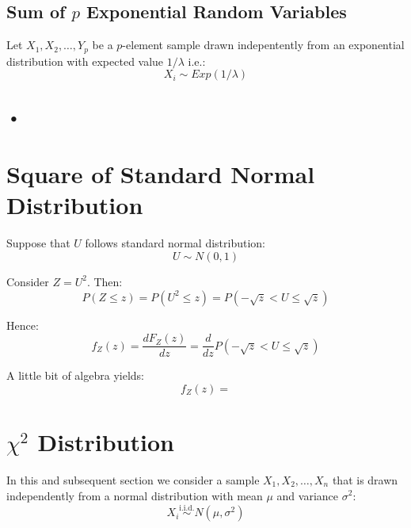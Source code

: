 \documentclass[12pt]{article}
\begin{document}
\subsection{Sum of $p$ Exponential Random Variables}
Let $X_1, X_2, \dots, Y_p$ be a $p$-element sample drawn indepentently from an exponential 
distribution with expected value $1 / \lambda$ i.e.:
\begin{equation*}
X_i \sim Exp(1/\lambda)
\end{equation*}

\subsection{•}


\section{Square of Standard Normal Distribution}
Suppose that $U$ follows standard normal distribution:
\begin{equation*}
U \sim N(0, 1)
\end{equation*}

Consider $Z = U^2$. Then:
\begin{equation*}
P(Z \leq z) = P(U^2 \leq z) = P(-\sqrt{z} < U \leq \sqrt{z})
\end{equation*}

Hence:
\begin{equation*}
f_{Z}(z) = \frac{dF_{Z}(z)}{dz} = \frac{d}{dz} P(-\sqrt{z} < U \leq \sqrt{z})
\end{equation*}

A little bit of algebra yields:
\begin{equation*}
f_{Z}(z) = 
\end{equation*}


\section{$\chi^2$ Distribution}
In this and subsequent section we consider a sample $X_1, X_2, \dots, X_n$ 
that is drawn independently from a normal 
distribution with mean $\mu$ and variance $\sigma^2$:
\begin{equation*}
X_i \overset{\text{i.i.d.}}{\sim} N(\mu, \sigma^2)
\end{equation*}



\end{document}

